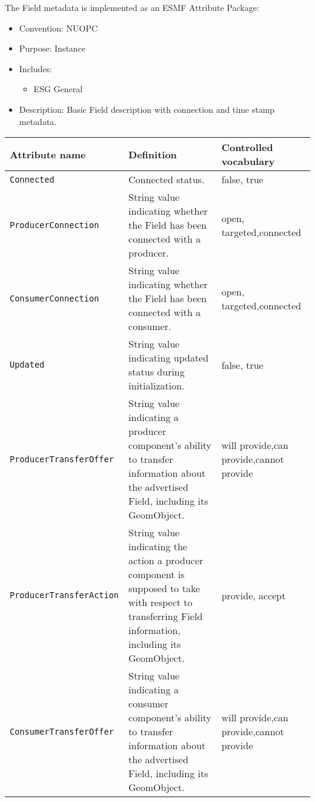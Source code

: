 \label{FieldMeta}
The Field metadata is implemented as an ESMF Attribute Package:

\begin{itemize}
    \item Convention: NUOPC
    \item Purpose: Instance
    \item Includes:
    \begin{itemize}
        \item ESG General
    \end{itemize} 
    \item Description: Basic Field description with connection and time stamp metadata. 
\end{itemize}

\begin{longtable}{|p{}|p{}|p{}|}
     \hline\hline
     {\bf Attribute name} & {\bf Definition} & {\bf Controlled vocabulary}\\
     \hline\hline
     {\tt Connected} & Connected status.& false, true\\ \hline
     {\tt ProducerConnection} & String value indicating whether the Field has been connected with a producer. & open, targeted,\newline connected\\ \hline
     {\tt ConsumerConnection} & String value indicating whether the Field has been connected with a consumer.& open, targeted,\newline connected\\ \hline
     {\tt Updated} & String value indicating updated status during initialization.& false, true\\ \hline
     {\tt ProducerTransferOffer} & String value indicating a producer component's ability to transfer information about the advertised Field, including its GeomObject.& will provide,\newline can provide,\newline cannot provide\\ \hline
     {\tt ProducerTransferAction} & String value indicating the action a producer component is supposed to take with respect to transferring Field information, including its GeomObject.& provide, accept\\ \hline
     {\tt ConsumerTransferOffer} & String value indicating a consumer component's ability to transfer information about the advertised Field, including its GeomObject.& will provide,\newline can provide,\newline cannot provide\\ \hline

\end{longtable}
